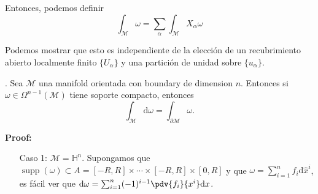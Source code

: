\documentclass[../main]{subfiles}
\begin{document}
\begin{adjustwidth}{0pt}{-100pt}
Entonces, podemos definir 
\begin{equation}
    \int_{\mathcal{M}} \omega=\sum_{\alpha} \int_{\mathcal{M}} X_{\alpha} \omega 
\end{equation}

Podemos mostrar que esto es independiente de la elección de un recubrimiento abierto localmente finito $\{ U_{\alpha}\}$ y una partición de unidad sobre $\{u_{\alpha}\}$.

\teorema{\textcolor{red}{Teorema de Stokes}}. Sea $\mathcal{M}$ una manifold orientada con boundary de dimension $n$. Entonces si $\omega \in \Omega^{n-1}(\mathcal{M})$ tiene soporte compacto, entonces 
\begin{equation}
    \int_{\mathcal{M}} \mathrm{d}\omega=\int_{\partial\mathcal{M}} \omega.
\end{equation}

\textbf{Proof:}
\begin{enumerate}[itemindent=1cm]
    \item[Caso 1:] $\mathcal{M}=\mathbb{H}^n$. Supongamos que $\operatorname{supp} (\omega) \subset A=[-R, R] \times \cdots \times [-R, R] \times [0, R]$ y que $\omega=\sum_{i=1}^n f_i \mathrm{d}\hat{x}^{i}$, es fácil ver que $\mathrm{d}\omega=\sum_{i=1}^n (-1)^{i-1}\pdv{f_i}{x^{i}}\mathrm{d}x$.
    

\end{enumerate}
\end{adjustwidth}
\end{document}
